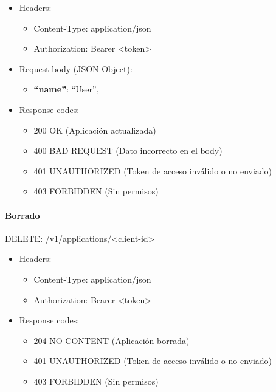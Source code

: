 \documentclass[12pt,a4paperpaper,]{report}
\providecommand{\tightlist}{%
  \setlength{\itemsep}{0pt}\setlength{\parskip}{0pt}}
\let\oldparagraph\paragraph
\renewcommand{\paragraph}[1]{\oldparagraph{#1}\mbox{}}
\begin{document}
\begin{itemize}
\tightlist
\item
  Headers:

  \begin{itemize}
  \tightlist
  \item
    Content-Type: application/json
  \item
    Authorization: Bearer \textless{}token\textgreater{}
  \end{itemize}
\item
  Request body (JSON Object):

  \begin{itemize}
  \tightlist
  \item
    \textbf{``name''}: ``User'',
  \end{itemize}
\item
  Response codes:

  \begin{itemize}
  \tightlist
  \item
    200 OK (Aplicación actualizada)
  \item
    400 BAD REQUEST (Dato incorrecto en el body)
  \item
    401 UNAUTHORIZED (Token de acceso inválido o no enviado)
  \item
    403 FORBIDDEN (Sin permisos)
  \end{itemize}
\end{itemize}

\paragraph{Borrado}\label{borrado-2}

DELETE: /v1/applications/\textless{}client-id\textgreater{}

\begin{itemize}
\tightlist
\item
  Headers:

  \begin{itemize}
  \tightlist
  \item
    Content-Type: application/json
  \item
    Authorization: Bearer \textless{}token\textgreater{}
  \end{itemize}
\item
  Response codes:

  \begin{itemize}
  \tightlist
  \item
    204 NO CONTENT (Aplicación borrada)
  \item
    401 UNAUTHORIZED (Token de acceso inválido o no enviado)
  \item
    403 FORBIDDEN (Sin permisos)
  \end{itemize}
\end{itemize}
\end{document}
